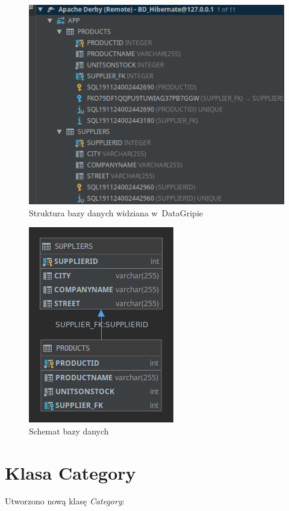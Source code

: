 \documentclass[12pt, a4paper]{mwart}
\begin{document}
\begin{figure}[ht]
  \centering
  \includegraphics[scale=0.5]{V/5-4.png}
  \caption{Struktura bazy danych widziana w~DataGripie}
  \label{rys:5.4}
\end{figure}

\begin{figure}[ht]
  \centering
  \includegraphics[scale=0.5]{V/5-5.png}
  \caption{Schemat bazy danych}
  \label{rys:5.5}
\end{figure}

\clearpage
\section{Klasa Category}

Utworzono nową klasę \textit{Category}:
\end{document}
